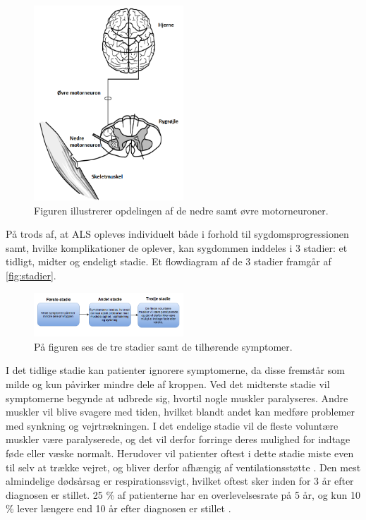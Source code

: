 \begin{figure}[H]
\centering
\includegraphics[width=0.5\textwidth]{figures/motorneuroner.png}
\caption{Figuren illustrerer opdelingen af de nedre samt øvre motorneuroner. \citep{miller2005}}
\label{fig:motorneuroner}
\end{figure}

På trods af, at ALS opleves individuelt både i forhold til sygdomsprogressionen samt, hvilke komplikationer de oplever, kan sygdommen inddeles i 3 stadier: et tidligt, midter og endeligt stadie. Et flowdiagram af de 3 stadier framgår af \autoref{fig:stadier}.

\begin{figure}[H]
\centering
\includegraphics[width=0.5\textwidth]{figures/stadier.png}
\caption{På figuren ses de tre stadier samt de tilhørende symptomer.}
\label{fig:stadier}
\end{figure}

I det tidlige stadie kan patienter ignorere symptomerne, da disse fremstår som milde og kun påvirker mindre dele af kroppen. 
Ved det midterste stadie vil symptomerne begynde at udbrede sig, hvortil nogle muskler paralyseres. Andre muskler vil blive svagere med tiden, hvilket blandt andet kan medføre problemer med synkning og vejrtrækningen. I det endelige stadie vil de fleste voluntære muskler være paralyserede, og det vil derfor forringe deres mulighed for indtage føde eller væske normalt. Herudover vil patienter oftest i dette stadie miste even til selv at trække vejret, og bliver derfor afhængig af ventilationsstøtte \citep{themusculardystrophyassociation2016}.
Den mest almindelige dødsårsag er respirationssvigt, hvilket oftest sker inden for 3 år efter diagnosen er stillet. 25 \% af patienterne har en overlevelsesrate på 5 år, og kun 10 \% lever længere end 10 år efter diagnosen er stillet \citep{grehl2011, miller2005}.




